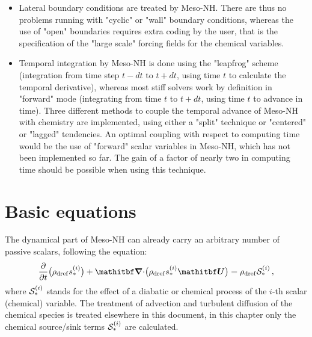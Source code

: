 \begin{itemize}
\begin{itemize}
    \item Lateral boundary conditions are treated by Meso-NH.
        There are thus no problems
        running with "cyclic" or "wall" boundary conditions, whereas
        the use of "open" boundaries requires extra coding by the user,
        that is the specification of the "large scale" forcing fields
        for the chemical variables.
    \item Temporal integration by Meso-NH is done using the "leapfrog" scheme
        (integration from time step $t-dt$ to $t+dt$, using time $t$
        to calculate the temporal derivative),
        whereas most stiff solvers work by definition in "forward" mode
        (integrating from time $t$ to $t+dt$,
        using time $t$ to advance in time).
        Three different methods to couple the temporal advance of
        Meso-NH with chemistry are implemented, using either a "split"
        technique or "centered" or "lagged" tendencies.
        An optimal coupling with respect to computing time would be
        the use of "forward" scalar variables in Meso-NH, which has not been
        implemented so far. The gain of a factor of nearly
        two in computing time should be possible when using this technique.
  \end{itemize}
\end{itemize}
\section{Basic equations}
%
The dynamical part of Meso-NH
can already carry an arbitrary number of passive scalars,
following the equation:
%
\begin{equation}
\ddt \big(\rhod \scalar{i}\big) + \divergence \big(\rhod \scalar{i} \vec U \big)
= \rhod \source{i}
\,,
\label{basic1}
\end{equation}
%
where ${\cal S}_\ast^{(i)}$  stands for the effect of a diabatic or chemical process 
of the $i$-th scalar (chemical) variable.
The treatment of advection and turbulent diffusion of the chemical
species is treated elsewhere in this document,
in this chapter only the chemical source/sink terms ${\cal S}_\ast^{(i)}$ are calculated.

